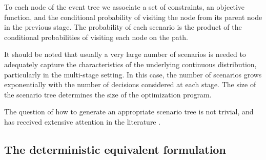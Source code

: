 To each node of the event tree we associate a set of constraints, an 
objective function, and the conditional probability of visiting the 
node from its parent node in the previous stage.
The probability of each scenario is the product of the 
conditional probabilities of visiting each node on the path.

It should be noted that usually a very large number of scenarios is
needed to adequately capture the characteristics of the underlying
continuous distribution, particularly in the multi-stage setting.
In this case, the number of scenarios grows exponentially with the
number of decisions considered at each stage.
The size of the scenario tree determines the size of the optimization
program.

The question of how to generate an appropriate scenario tree
is not trivial, and has received extensive attention in the
literature 
\cite{DupacovaConsigliWallace,HoylandKautWallace,HoylandWallace,Pflug01}.

%
%
\subsection{The deterministic equivalent formulation}
\label{DetEqForm}

